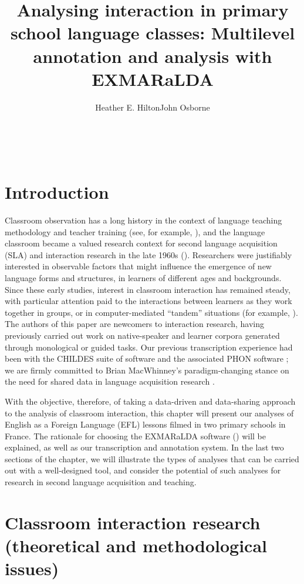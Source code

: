 \documentclass[output=paper,colorlinks,citecolor=brown,modfonts,nonflat]{../langscibook}
\author{Heather E. Hilton\affiliation{Université Lumière Lyon 2}\orcid{}\lastand John Osborne\affiliation{Université Savoie Mont Blanc}\orcid{}}
\title{Analysing interaction in primary school language classes: Multilevel annotation and analysis with EXMARaLDA}
\begin{document}
\maketitle
\vspace*{-3cm}~\newpage

\section{Introduction}

Classroom observation has a long history in the context of language teaching methodology and teacher training (see, for example, \citealt{Passy1885, Brebner1898}), and the language classroom became a valued research context for second language acquisition (SLA) and interaction research in the late 1960s (\citealt{Moskowitz1976, Jarvis1968, Wragg1970, SeligerLong1983, Allwright1984, Véronique1992}). Researchers were justifiably interested in observable factors that might influence the emergence of new language forms and structures, in learners of different ages and backgrounds. Since these early studies, interest in classroom interaction has remained steady, with particular attention paid to the interactions between learners as they work together in groups, or in computer-mediated “tandem” situations (for example, \citealt{DevelotteEtAl2008}). The authors of this paper are newcomers to interaction research, having previously carried out work on native-speaker and learner corpora generated through monological or guided tasks. Our previous transcription experience had been with the CHILDES suite of software \citep{MacWhinney2000} and the associated PHON software \citep{RoseEtAl2006}; we are firmly committed to Brian MacWhinney’s paradigm-changing stance on the need for shared data in language acquisition research \citep[27--30]{MacWhinney2010}.

With the objective, therefore, of taking a data-driven and data-sharing approach to the analysis of classroom interaction, this chapter will present our analyses of English as a Foreign Language  (EFL) lessons filmed in two primary schools in France. The rationale for choosing the EXMARaLDA software (\citealt{SchmidtWörner2014}) will be explained, as well as our transcription and annotation system. In the last two sections of the chapter, we will illustrate the types of analyses that can be carried out with a well-designed tool, and consider the potential of such analyses for research in second language acquisition and teaching.

\section{Classroom interaction research (theoretical and methodological issues)}\label{sec:hilton:2}
\end{document}
